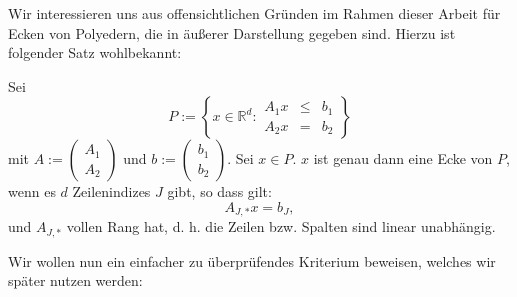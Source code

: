 \documentclass[10p,a4paper,BCOR = 12mm, DIV=15]{scrbook}
\begin{document}
Wir interessieren uns aus offensichtlichen Gründen im Rahmen dieser Arbeit für Ecken von Polyedern, die in äußerer Darstellung gegeben sind. Hierzu ist folgender Satz wohlbekannt:
\begin{Sa}
\label{sa:ecke_polyeder}
Sei
\begin{displaymath}
P := \left\{x \in \mathbb{R}^d:
\begin{array}{ccc}
A_1 x & \leq & b_1 \\
A_2 x & = & b_2
\end{array}
\right\}
\end{displaymath}
mit $A := \left(
\begin{array}{cc}
A_1 \\
A_2
\end{array}
\right)$
und $b := \left(
\begin{array}{cc}
b_1 \\
b_2
\end{array}
\right)$. Sei $x\in P$. $x$ ist genau dann eine Ecke von $P$, wenn es $d$ Zeilenindizes $J$ gibt, so dass gilt:
\begin{displaymath}
A_{J, *} x = b_J,
\end{displaymath}
und $A_{J, *}$ vollen Rang hat, d. h. die Zeilen bzw. Spalten sind linear unabhängig.
\end{Sa}

Wir wollen nun ein einfacher zu überprüfendes Kriterium beweisen, welches wir später nutzen werden:
\end{document}

